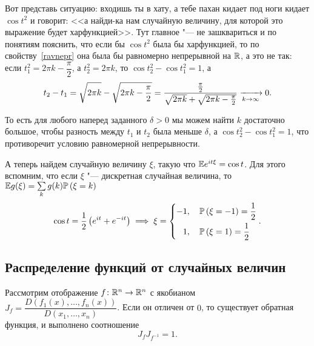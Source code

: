 \documentclass[../TV&MS.tex]{subfiles}
\begin{document}
\begin{Ex}
    Вот представь ситуацию: входишь ты в хату, а тебе пахан кидает под ноги
    кидает $\cos t^2$ и говорит: <<а найди-ка нам случайную величину, для 
    которой это выражение будет харфункцией>>. Тут главное "--- не зашквариться
    и по понятиям пояснить, что если бы $\cos t^2$ была бы харфункцией, то по
    свойству~\eqref{ravnepr} она была бы равномерно непрерывной на $\mathbb{R}$,
    а это не так: если $t_1^2 = 2\pi k - \dfrac{\pi}{2}$, а $t_2^2 = 2\pi k$,
    то $\cos t_2^2 - \cos t_1^2 = 1$, а
    \[
        t_2 - t_1 =\sqrt{\vphantom{\frac{\pi}{2}} 2\pi k} - \sqrt{2\pi k - \frac{\pi}{2} } = 
        \frac{\frac{\pi}{2}}{\sqrt{\vphantom{\frac{\pi}{2}} 2\pi k} + \sqrt{2\pi k - \frac{\pi}{2} }}
        \xrightarrow[k \rightarrow \infty]{} 0. 
    \]
    
    То есть для любого наперед заданного $\delta > 0$ мы можем найти $k$
    достаточно большое, чтобы разность между $t_1$ и $t_2$ была меньше
    $\delta$, а $\cos t_2^2 - \cos t_1^2 = 1$, что противоречит условию 
    равномерной непрерывности.
\end{Ex}

\begin{Ex}
    А теперь найдем случайную величину $\xi$, такую что $\mathbb{E} e^{it\xi} = \cos t$.
    Для этого вспомним, что если $\xi$ "--- дискретная случайная величина, то 
    $\mathbb{E} g(\xi) = \sum\limits_{k} g(k) \mathbb{P} \left( \xi = k \right)  $
    \[
        \cos t = \frac{1}{2} \left( e^{it} + e^{-it} \right)
        \implies \xi = 
        \left\{
            \begin{aligned}
                -1 &, \quad \mathbb{P}\left(\xi = -1\right) = \frac{1}{2} \\
                1 &, \quad \mathbb{P} \left( \xi = 1 \right) = \frac{1}{2}
            \end{aligned}
        \right. 
    .\] 
\end{Ex} 
		
\subsection{Распределение функций от случайных величин}

	Рассмотрим отображение $f\colon \mathbb{R}^n \to \mathbb{R}^n$ с якобианом 
	$J_f = \dfrac{D(f_1(x), \ldots, f_n(x))}{D(x_1, \ldots, x_n)}$.
	Если он отличен от $0$, то существует обратная функция, и выполнено соотношение
	$$J_fJ_{f^{-1}} = 1.$$
\end{document}
